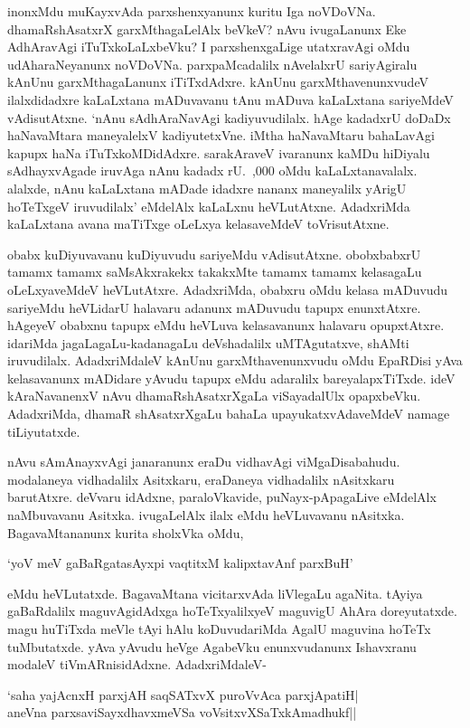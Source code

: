 inonxMdu muKayxvAda parxshenxyanunx kuritu Iga noVDoVNa. dhamaRshAsatxrX garxMthagaLelAlx beVkeV? nAvu ivugaLanunx Eke AdhAravAgi iTuTxkoLaLxbeVku? I parxshenxgaLige utatxravAgi oMdu udAharaNeyanunx noVDoVNa. parxpaMcadalilx nAvelalxrU sariyAgiralu kAnUnu garxMthagaLanunx iTiTxdAdxre. kAnUnu garxMthavenunxvudeV ilalxdidadxre kaLaLxtana mADuvavanu tAnu mADuva kaLaLxtana sariyeMdeV vAdisutAtxne. `nAnu sAdhAraNavAgi kadiyuvudilalx. hAge kadadxrU doDaDx haNavaMtara maneyalelxV kadiyutetxVne. iMtha haNavaMtaru bahaLavAgi kapupx haNa iTuTxkoMDidAdxre. sarakAraveV ivaranunx kaMDu hiDiyalu sAdhayxvAgade iruvAga nAnu kadadx rU.\ {,000} oMdu kaLaLxtanavalalx. alalxde, nAnu kaLaLxtana mADade idadxre nananx maneyalilx yArigU hoTeTxgeV iruvudilalx' eMdelAlx kaLaLxnu heVLutAtxne. AdadxriMda kaLaLxtana avana maTiTxge oLeLxya kelasaveMdeV toVrisutAtxne.

obabx kuDiyuvavanu kuDiyuvudu sariyeMdu vAdisutAtxne. obobxbabxrU tamamx tamamx saMsAkxrakekx takakxMte tamamx tamamx kelasagaLu oLeLxyaveMdeV heVLutAtxre. AdadxriMda, obabxru oMdu kelasa mADuvudu sariyeMdu heVLidarU halavaru adanunx mADuvudu tapupx enunxtAtxre. hAgeyeV obabxnu tapupx eMdu heVLuva kelasavanunx halavaru opupxtAtxre. idariMda jagaLagaLu-kadanagaLu deVshadalilx uMTAgutatxve, shAMti iruvudilalx. AdadxriMdaleV kAnUnu garxMthavenunxvudu oMdu EpaRDisi yAva kelasavanunx mADidare yAvudu tapupx eMdu adaralilx bareyalapxTiTxde. ideV kAraNavanenxV nAvu dhamaRshAsatxrXgaLa viSayadalUlx opapxbeVku. AdadxriMda, dhamaR shAsatxrXgaLu bahaLa upayukatxvAdaveMdeV namage tiLiyutatxde.

nAvu sAmAnayxvAgi janaranunx eraDu vidhavAgi viMgaDisabahudu. modalaneya vidhadalilx Asitxkaru, eraDaneya vidhadalilx nAsitxkaru barutAtxre. deVvaru idAdxne, paraloVkavide, puNayx-pApagaLive eMdelAlx naMbuvavanu Asitxka. ivugaLelAlx ilalx eMdu heVLuvavanu nAsitxka. BagavaMtananunx kurita sholxVka oMdu, 

\begin{shloka}
`yoV meV gaBaRgatasAyxpi vaqtitxM kalipxtavAnf parxBuH'
\end{shloka}

eMdu heVLutatxde. BagavaMtana vicitarxvAda liVlegaLu agaNita. tAyiya gaBaRdalilx maguvAgidAdxga hoTeTxyalilxyeV maguvigU AhAra doreyutatxde. magu huTiTxda meVle tAyi hAlu koDuvudariMda AgalU maguvina hoTeTx tuMbutatxde. yAva yAvudu heVge AgabeVku enunxvudanunx Ishavxranu modaleV tiVmARnisidAdxne. AdadxriMdaleV-

\begin{shloka}
`saha yajAcnxH parxjAH saqSATxvX puroVvAca parxjApatiH|\\
aneVna parxsaviSayxdhavxmeVSa voV\s sitxvXSaTxkAmadhukf||
\end{shloka}


